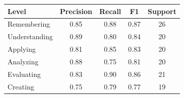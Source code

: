 \begin{tabular}{lcccc}
\hline
Level & Precision & Recall & F1 & Support \\
\hline
Remembering & 0.85 & 0.88 & 0.87 & 26 \\
Understanding & 0.89 & 0.80 & 0.84 & 20 \\
Applying & 0.81 & 0.85 & 0.83 & 20 \\
Analyzing & 0.88 & 0.75 & 0.81 & 20 \\
Evaluating & 0.83 & 0.90 & 0.86 & 21 \\
Creating & 0.75 & 0.79 & 0.77 & 19 \\
\hline
\end{tabular}